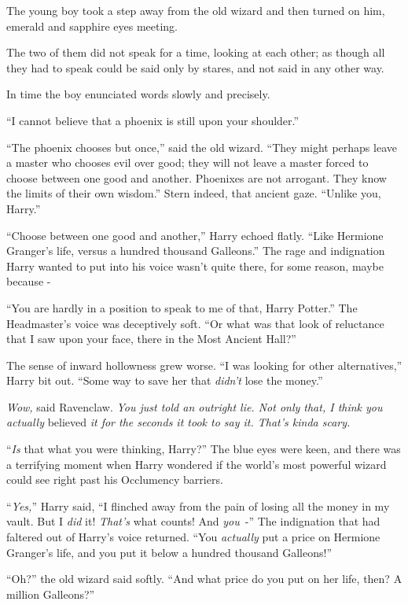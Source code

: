 The young boy took a step away from the old wizard and then turned on him, emerald and sapphire eyes meeting.

The two of them did not speak for a time, looking at each other; as though all they had to speak could be said only by stares, and not said in any other way.

In time the boy enunciated words slowly and precisely.

``I cannot believe that a phoenix is still upon your shoulder.''

``The phoenix chooses but once,'' said the old wizard. ``They might perhaps leave a master who chooses evil over good; they will not leave a master forced to choose between one good and another. Phoenixes are not arrogant. They know the limits of their own wisdom.'' Stern indeed, that ancient gaze. ``Unlike you, Harry.''

``Choose between one good and another,'' Harry echoed flatly. ``Like Hermione Granger's life, versus a hundred thousand Galleons.'' The rage and indignation Harry wanted to put into his voice wasn't quite there, for some reason, maybe because -

``You are hardly in a position to speak to me of that, Harry Potter.'' The Headmaster's voice was deceptively soft. ``Or what was that look of reluctance that I saw upon your face, there in the Most Ancient Hall?''

The sense of inward hollowness grew worse. ``I was looking for other alternatives,'' Harry bit out. ``Some way to save her that \emph{didn't} lose the money.''

\emph{Wow,} said Ravenclaw. \emph{You just told an outright lie. Not only that, I think you actually} believed \emph{it for the seconds it took to say it. That's kinda scary.}

``\emph{Is} that what you were thinking, Harry?'' The blue eyes were keen, and there was a terrifying moment when Harry wondered if the world's most powerful wizard could see right past his Occlumency barriers.

``\emph{Yes,}'' Harry said, ``I flinched away from the pain of losing all the money in my vault. But I \emph{did} it! \emph{That's} what counts! And \emph{you}~-'' The indignation that had faltered out of Harry's voice returned. ``You \emph{actually} put a price on Hermione Granger's life, and you put it below a hundred thousand Galleons!''

``Oh?'' the old wizard said softly. ``And what price do you put on her life, then? A million Galleons?''

